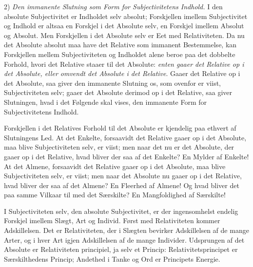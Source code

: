 \documentclass[12pt]{book}
\newcommand{\opage}[1]{\marginnote{\footnotesize\textit{[#1]}}}
\begin{document}
2) \emph{Den immanente Slutning som Form for Subjectivitetens Indhold.} I den absolute Subjectivitet er Indholdet selv absolut; Forskjellen imellem Subjectivitet og Indhold er altsaa en Forskjel i det Absolute selv, en Forskjel imellem Absolut og Absolut. Men Forskjellen i det Absolute selv er Eet med Relativiteten. Da nu det Absolute absolut maa have det Relative som immanent Bestemmelse, kan Forskjellen mellem Subjectiviteten og Indholdet alene beroe paa det dobbelte Forhold, hvori det Relative staaer til det Absolute: \emph{enten gaaer det Relative op i det Absolute, eller omvendt det Absolute i det Relative}. Gaaer det Relative op i det Absolute, saa giver den immanente Slutning os, som ovenfor er viist, Subjectiviteten selv; gaaer det Absolute derimod op i det Relative, saa giver Slutningen, hvad i det Følgende skal vises, den immanente Form for Subjectivitetens Indhold.

Forskjellen i det Relatives Forhold til det Absolute er kjendelig paa ethvert af Slutningens Led. At det Enkelte, forsaavidt det Relative gaaer op i det Absolute, maa blive Subjectiviteten selv, er viist; men naar det nu er det Absolute, der gaaer op i det Relative, hvad bliver der saa af det Enkelte? En Mylder af Enkelte! At det Almene, forsaavidt det Relative gaaer op i det Absolute, maa blive Subjectiviteten selv, er viist; men naar det Absolute nu gaaer op i det Relative, hvad bliver der saa af det Almene? En Fleerhed af Almene! Og hvad bliver det paa samme Vilkaar til med det Særskilte? En Mangfoldighed af Særskilte!

I Subjectiviteten selv, den absolute Subjectivitet, er der ingensomhelst endelig Forskjel imellem Slægt, Art og Individ. Først med Relativiteten kommer Adskillelsen. Det er Relativiteten, der i Slægten bevirker Adskillelsen af de mange
\opage{345}Arter, og i hver Art igjen Adskillelsen af de mange Individer. Udsprungen af det Absolute er Relativiteten principiel, ja selv et Princip: Relativitetsprincipet er Særskilthedens Princip; Andethed i Tanke og Ord er Principets Energie.
\end{document}
